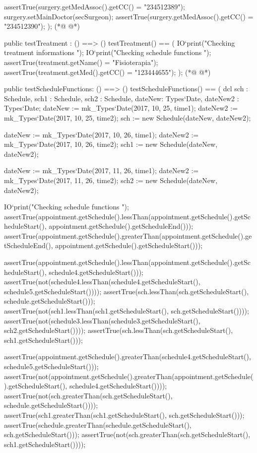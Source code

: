 \begin{vdmpp}[breaklines=true]
   assertTrue(surgery.getMedAssoc().getCC() = "234512389");
   surgery.setMainDoctor(secSurgeon);
   assertTrue(surgery.getMedAssoc().getCC() = "234512390");
 );
(*@
\label{testTreatment:247}
@*)
 
 public testTreatment : () ==> ()
  testTreatment() == (
   IO`print("\n Checking treatment informations \n");
   IO`print("\n Checking schedule functions \n");
   assertTrue(treatment.getName() = "Fisioterapia");
   assertTrue(treatment.getMed().getCC() = "123444655");
  );
(*@
\label{testScheduleFunctions:255}
@*)
  
  public testScheduleFunctions: () ==> ()
  testScheduleFunctions() == (
   dcl sch : Schedule, sch1 : Schedule, sch2 : Schedule, dateNew: Types`Date, dateNew2 : Types`Date;
   dateNew := mk_Types`Date(2017, 10, 25, time1);
   dateNew2 := mk_Types`Date(2017, 10, 25, time2);
   sch := new Schedule(dateNew, dateNew2);
   
   dateNew := mk_Types`Date(2017, 10, 26, time1);
   dateNew2 := mk_Types`Date(2017, 10, 26, time2);
   sch1 := new Schedule(dateNew, dateNew2);
   
   dateNew := mk_Types`Date(2017, 11, 26, time1);
   dateNew2 := mk_Types`Date(2017, 11, 26, time2);
   sch2 := new Schedule(dateNew, dateNew2);
   
   IO`print("\n Checking schedule functions \n");
   assertTrue(appointment.getSchedule().lessThan(appointment.getSchedule().getScheduleStart(), appointment.getSchedule().getScheduleEnd()));
   assertTrue(appointment.getSchedule().greaterThan(appointment.getSchedule().getScheduleEnd(), appointment.getSchedule().getScheduleStart()));
   
   assertTrue(appointment.getSchedule().lessThan(appointment.getSchedule().getScheduleStart(), schedule4.getScheduleStart()));
   assertTrue(not(schedule4.lessThan(schedule4.getScheduleStart(), schedule5.getScheduleStart())));
   assertTrue(sch.lessThan(sch.getScheduleStart(), schedule.getScheduleStart()));
   assertTrue(not(sch1.lessThan(sch1.getScheduleStart(), sch.getScheduleStart())));
   assertTrue(not(schedule3.lessThan(schedule3.getScheduleStart(), sch2.getScheduleStart())));
   assertTrue(sch.lessThan(sch.getScheduleStart(), sch1.getScheduleStart()));
   
   assertTrue(appointment.getSchedule().greaterThan(schedule4.getScheduleStart(), schedule5.getScheduleStart()));
   assertTrue(not(appointment.getSchedule().greaterThan(appointment.getSchedule().getScheduleStart(), schedule4.getScheduleStart())));
   assertTrue(not(sch.greaterThan(sch.getScheduleStart(), schedule.getScheduleStart())));
   assertTrue(sch1.greaterThan(sch1.getScheduleStart(), sch.getScheduleStart()));
   assertTrue(schedule.greaterThan(schedule.getScheduleStart(), sch.getScheduleStart()));
   assertTrue(not(sch.greaterThan(sch.getScheduleStart(), sch1.getScheduleStart())));
   

\end{vdmpp}
